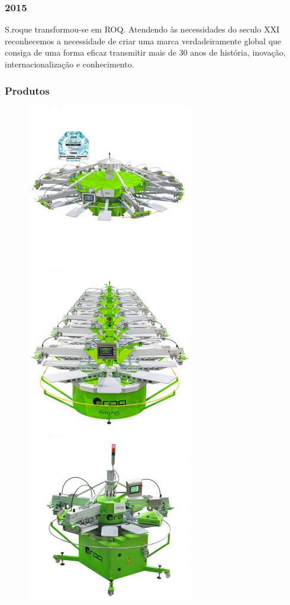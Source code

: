 \begin{frame}
\frametitle{2015}
S.roque transformou-se em ROQ. Atendendo às necessidades do seculo XXI reconhecemos a necessidade de criar uma marca verdadeiramente global que consiga de uma forma eficaz transmitir mais de 30 anos de história, inovação, internacionalização e conhecimento.
\end{frame}
\begin{frame}
\frametitle{Produtos}
\begin{figure}[ht]
\begin{center}
\includegraphics[scale=0.2]{./image/ROQ/maquinas/ECO-P18_600x600-2-275x275.jpg}
\includegraphics[scale=0.2]{./image/ROQ/maquinas/EVO-600x600-275x275.jpg}
\includegraphics[scale=0.2]{./image/ROQ/maquinas/nanop10-275x275.jpg}

\end{center}
\end{figure}
\end{frame}
